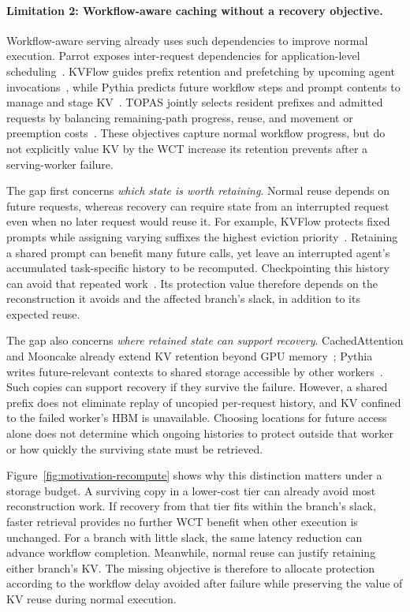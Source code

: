 \paragraph{Limitation 2: Workflow-aware caching without a recovery objective.}
Workflow-aware serving already uses such dependencies to improve normal
execution. Parrot exposes inter-request dependencies for application-level
scheduling~\cite{lin2024parrot}. KVFlow guides prefix retention and
prefetching by upcoming agent invocations~\cite{pan2025kvflow}, while Pythia
predicts future workflow steps and prompt contents to manage and stage
KV~\cite{yu2026pythia}. TOPAS jointly selects resident prefixes and admitted
requests by balancing remaining-path progress, reuse, and movement or
preemption costs~\cite{ni2026topas}. These objectives capture normal workflow
progress, but do not explicitly value KV by the WCT increase its retention
prevents after a serving-worker failure.

The gap first concerns \emph{which state is worth retaining}.
Normal reuse depends on future requests, whereas recovery can require
state from an interrupted request even when no later request would reuse
it. For example, KVFlow protects fixed prompts while assigning varying
suffixes the highest eviction priority~\cite{pan2025kvflow}.
Retaining a shared prompt can benefit many future calls, yet leave an
interrupted agent's accumulated task-specific history to be recomputed.
Checkpointing this history can avoid that repeated
work~\cite{strati2024dejavu}. Its protection value therefore depends on
the reconstruction it avoids and the affected branch's slack, in
addition to its expected reuse.

The gap also concerns \emph{where retained state can support recovery}.
CachedAttention and Mooncake already extend KV retention beyond GPU
memory~\cite{gao2024cachedattention,qin2025mooncake}; Pythia writes
future-relevant contexts to shared storage accessible by other
workers~\cite{yu2026pythia}. Such copies can support recovery if they survive
the failure. However, a shared prefix does not eliminate replay of
uncopied per-request history, and KV confined to the failed worker's HBM is
unavailable. Choosing locations for future access alone does not determine
which ongoing histories to protect outside that worker or how quickly
the surviving state must be retrieved.

\label{sec:motivation-long-context}
Figure~\ref{fig:motivation-recompute} shows why this distinction matters
under a storage budget. A surviving copy in a lower-cost tier can already
avoid most reconstruction work. If recovery from that tier fits within
the branch's slack, faster retrieval provides no further WCT benefit
when other execution is unchanged. For a branch with little slack,
the same latency reduction can advance workflow completion.
Meanwhile, normal reuse can justify retaining either branch's KV.
The missing objective is therefore to allocate protection according to
the workflow delay avoided after failure while preserving the value of
KV reuse during normal execution.

